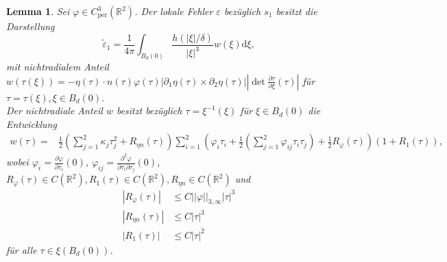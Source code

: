 \documentclass[12pt,a4paper]{scrartcl}
\newtheorem{Lemma}[Satz]{Lemma}
\newcommand{\dd}{\mathrm{d}}
\numberwithin{equation}{section}
\newcommand{\R}{\mathbb{R}} %
\newcommand{\per}{\operatorname{per}}
\begin{document}
\begin{Lemma} \label{Entww}
Sei $\varphi \in C_{\per}^3(\R^2)$. Der lokale Fehler $\varepsilon$ bezüglich $s_1$ besitzt die Darstellung
\begin{equation} \label{eps2}
\widetilde \varepsilon_1 = \frac{1}{4 \pi} \int_{B_d(0)}  \frac{h(|\xi|/\delta)}{|\xi|^3} w(\xi)\dd \xi,
\end{equation}
mit nichtradialem Anteil $w(\tau(\xi))= -\eta(\tau) \cdot n(\tau) \varphi(\tau)|\partial_1 \eta (\tau) \times \partial_2 \eta(\tau)||\operatorname{det}\frac{\partial\tau}{\partial\xi}(\tau)|$ für $\tau= \tau(\xi), \xi \in B_d(0)$. \\ Der nichtradiale Anteil $w$ besitzt bezüglich $\tau=\xi^{-1}(\xi)$ für $\xi \in B_d(0)$ die Entwicklung
\begin{align*} 
w(\tau)=&\frac{1}{2} \left(\sum_{j=1}^2 \kappa_j \tau_j^2 +R_{\eta n}(\tau) \right)
\sum_{i=1}^2\left(\varphi_i \tau_i + \frac{1}{2}\left(\sum_{j=1}^2\varphi_{ij}\tau_i\tau_j \right) + \frac{1}{2}R_\varphi(\tau)\right)(1+ R_1(\tau)),
\end{align*}
wobei $\varphi_i=\frac{\partial \varphi}{\partial \tau_i}(0)$, $\varphi_{ij}=\frac{\partial^2 \varphi}{\partial \tau_i \partial \tau_j}(0)$, $R_\varphi(\tau) \in C(\R^2), R_1(\tau) \in C(\R^2), R_{\eta n} \in C(\R^2)$ 
und 
\begin{align*}
|R_\varphi(\tau)| &\leq C ||\varphi||_{3,\infty} |\tau|^3\\
|R_{\eta n}(\tau)| & \leq C |\tau|^3 \\
|R_1(\tau)| & \leq C |\tau|^2
\end{align*}
für alle $\tau \in \xi(B_d(0))$.
\end{Lemma}
\end{document}
